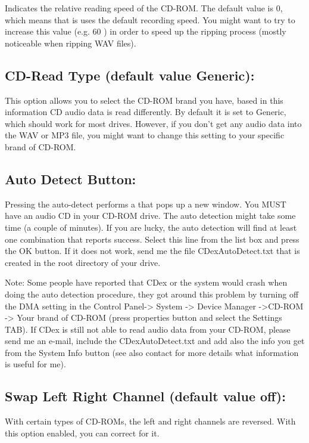 Indicates the relative reading speed of the CD-ROM. The default value is 0,
which means that is uses the default recording speed.  You might want to try
to increase this value (e.g. 60 ) in order to speed up the ripping process
(mostly noticeable when ripping WAV files).


\subsection{CD-Read Type (default value Generic):}

This option allows you to select the CD-ROM brand you have, based in this
information CD audio data is read differently. By default it is set to Generic,
which should work for most drives. However, if you don't get any audio data
into the WAV or MP3 file, you might want to change this setting to your
specific brand of CD-ROM.

\subsection{Auto Detect Button:}\label{autodetect}

Pressing the auto-detect performs a that pops up a new window. You
MUST have an audio CD in your CD-ROM drive. The auto detection might take some
time (a couple of minutes). If you are lucky, the auto detection will find at least
one combination that reports success. Select this line from the list box and
press the OK button. If it does not work, send me the file CDexAutoDetect.txt
that is created in the root directory of your drive.

Note: Some people have reported that CDex or the system would crash when doing the
auto detection procedure, they got around this problem by turning off the DMA setting in the
Control Panel-> System -> Device Manager ->CD-ROM -> Your brand of CD-ROM (press
properties button and select the Settings TAB). If CDex is still not able to read audio
data from your CD-ROM, please send me an e-mail, include the CDexAutoDetect.txt
and add also the info you get from the System Info button (see also contact
for more details what information is useful for me).


\subsection{Swap Left Right Channel (default value off):}

With certain types of  CD-ROMs, the left and right channels are reversed. With
this option enabled, you can correct for it.


